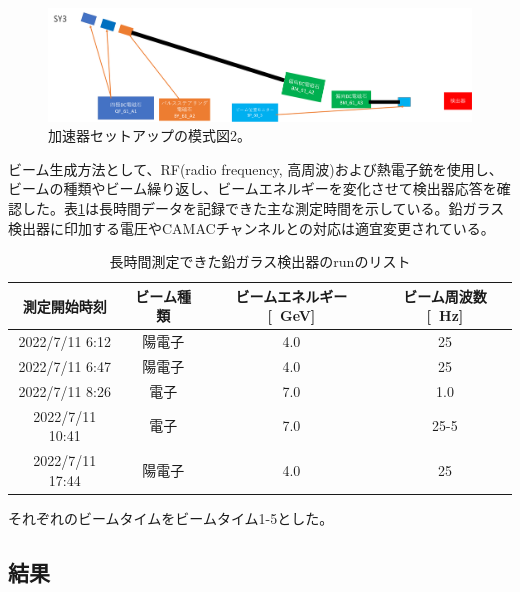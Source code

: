 \begin{figure}[H]
 		 	\includegraphics[width=400pt]{./Figure/EBES/EBES_beam2.png}%
	\caption[加速器セットアップの模式図2]{加速器セットアップの模式図2。}
	\label{EBES_beam2}
\end{figure}



ビーム生成方法として、RF(radio frequency, 高周波)および熱電子銃を使用し、ビームの種類やビーム繰り返し、ビームエネルギーを変化させて検出器応答を確認した。表\ref{EBES_run}は長時間データを記録できた主な測定時間を示している。鉛ガラス検出器に印加する電圧やCAMACチャンネルとの対応は適宜変更されている。


\begin{table}[h]
	\begin{center}
		\begin{tabular}{|cccc|}
		\hline
		測定開始時刻&ビーム種類&ビームエネルギー[\SI{}{GeV}]&ビーム周波数[\SI{}{Hz}]\\\hline\hline
		2022/7/11  6:12&陽電子&4.0&25\\\hline
		2022/7/11  6:47&陽電子&4.0&25\\\hline
		2022/7/11  8:26&電子&7.0&1.0\\\hline
		2022/7/11 10:41&電子&7.0&25-5 \\\hline
		2022/7/11 17:44&陽電子&4.0&25\\\hline
		\end{tabular}
	\end{center}
	\caption[長時間測定できた鉛ガラス検出器のrunのリスト]{長時間測定できた鉛ガラス検出器のrunのリスト}
\label{EBES_run}
\end{table}

それぞれのビームタイムをビームタイム1-5とした。

\subsection{結果}

